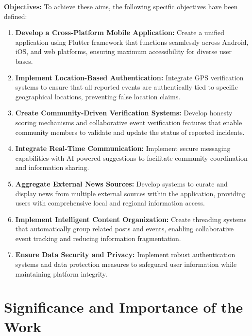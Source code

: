 \textbf{Objectives:} To achieve these aims, the following specific objectives have been defined:

\begin{enumerate}
    \item \textbf{Develop a Cross-Platform Mobile Application:} Create a unified application using Flutter framework that functions seamlessly across Android, iOS, and web platforms, ensuring maximum accessibility for diverse user bases.
    
    \item \textbf{Implement Location-Based Authentication:} Integrate GPS verification systems to ensure that all reported events are authentically tied to specific geographical locations, preventing false location claims.
    
    \item \textbf{Create Community-Driven Verification Systems:} Develop honesty scoring mechanisms and collaborative event verification features that enable community members to validate and update the status of reported incidents.
    
    \item \textbf{Integrate Real-Time Communication:} Implement secure messaging capabilities with AI-powered suggestions to facilitate community coordination and information sharing.
    
    \item \textbf{Aggregate External News Sources:} Develop systems to curate and display news from multiple external sources within the application, providing users with comprehensive local and regional information access.
    
    \item \textbf{Implement Intelligent Content Organization:} Create threading systems that automatically group related posts and events, enabling collaborative event tracking and reducing information fragmentation.
    
    \item \textbf{Ensure Data Security and Privacy:} Implement robust authentication systems and data protection measures to safeguard user information while maintaining platform integrity.
\end{enumerate}

\section{Significance and Importance of the Work}
\label{sec:intro_significance}

